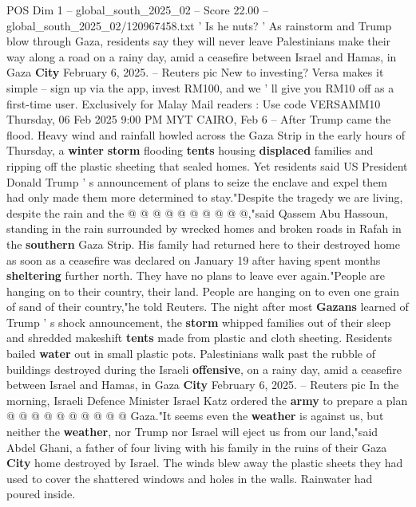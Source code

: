 \begin{textsample}{POS Dim 1 – global\_south\_2025\_02 – Score 22.00 – global\_south\_2025\_02/120967458.txt}  \label{ex:f1_pos_414}
' Is he nuts? ' As rainstorm and Trump blow through Gaza, residents say they will never leave Palestinians make their way along a road on a rainy day, amid a ceasefire between Israel and Hamas, in Gaza \textbf{City} February 6, 2025. -- Reuters pic New to investing?
Versa makes it simple -- sign up via the app, invest RM100, and we ' ll give you RM10 off as a first-time user.
Exclusively for Malay Mail readers : Use code VERSAMM10 Thursday, 06 Feb 2025 9:00 PM MYT CAIRO, Feb 6 -- After Trump came the flood.
Heavy wind and rainfall howled across the Gaza Strip in the early hours of Thursday, a \textbf{winter} \textbf{storm} flooding \textbf{tents} housing \textbf{displaced} families and ripping off the plastic sheeting that sealed homes.
Yet residents said US President Donald Trump ' s announcement of plans to seize the enclave and expel them had only made them more determined to stay."Despite the tragedy we are living, despite the rain and the @ @ @ @ @ @ @ @ @ @,"said Qassem Abu Hassoun, standing in the rain surrounded by wrecked homes and broken roads in Rafah in the \textbf{southern} Gaza Strip.
His family had returned here to their destroyed home as soon as a ceasefire was declared on January 19 after having spent months \textbf{sheltering} further north.
They have no plans to leave ever again."People are hanging on to their country, their land.
People are hanging on to even one grain of sand of their country,"he told Reuters.
The night after most \textbf{Gazans} learned of Trump ' s shock announcement, the \textbf{storm} whipped families out of their sleep and shredded makeshift \textbf{tents} made from plastic and cloth sheeting.
Residents bailed \textbf{water} out in small plastic pots.
Palestinians walk past the rubble of buildings destroyed during the Israeli \textbf{offensive}, on a rainy day, amid a ceasefire between Israel and Hamas, in Gaza \textbf{City} February 6, 2025. -- Reuters pic In the morning, Israeli Defence Minister Israel Katz ordered the \textbf{army} to prepare a plan @ @ @ @ @ @ @ @ @ @ Gaza."It seems even the \textbf{weather} is against us, but neither the \textbf{weather}, nor Trump nor Israel will eject us from our land,"said Abdel Ghani, a father of four living with his family in the ruins of their Gaza \textbf{City} home destroyed by Israel.
The winds blew away the plastic sheets they had used to cover the shattered windows and holes in the walls.
Rainwater had poured inside.

\end{textsample}
